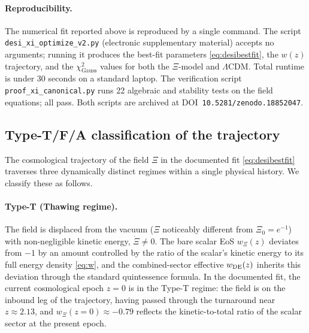 \documentclass[11pt,reqno]{amsart}
\theoremstyle{plain}
\theoremstyle{definition}
\theoremstyle{remark}
\begin{document}
\paragraph{Reproducibility.}
The numerical fit reported above is reproduced by a single command. The
script \texttt{desi\_xi\_optimize\_v2.py} (electronic supplementary material)
accepts no arguments; running it produces the best-fit parameters
\eqref{eq:desibestfit}, the $w(z)$ trajectory, and the
$\chi^{2}_{\text{Gauss}}$ values for both the $\Xi$-model and
$\Lambda$CDM. Total runtime is under 30 seconds on a standard laptop.
The verification script \texttt{proof\_xi\_canonical.py} runs 22
algebraic and stability tests on the field equations; all pass. Both
scripts are archived at DOI~\texttt{10.5281/zenodo.18852047}.

\subsection{Type-T/F/A classification of the trajectory}\label{sec:typeTFA}

The cosmological trajectory of the field $\Xi$ in the documented fit
\eqref{eq:desibestfit} traverses three dynamically distinct regimes
within a single physical history. We classify these as follows.

\paragraph{Type-T (Thawing regime).}
The field is displaced from the vacuum ($\Xi$ noticeably different from
$\Xi_0 = e^{-1}$) with non-negligible kinetic energy, $\dot\Xi \neq 0$.
The bare scalar EoS $w_\Xi(z)$ deviates from $-1$ by an amount controlled
by the ratio of the scalar's kinetic energy to its full energy density
\eqref{eq:w}, and the combined-sector effective $w_{\rm DE}(z)$ inherits
this deviation through the standard quintessence formula. In the
documented fit, the current cosmological epoch $z = 0$ is in the Type-T
regime: the field is on the inbound leg of the trajectory, having
passed through the turnaround near $z \approx 2.13$, and
$w_\Xi(z = 0) \approx -0.79$ reflects the kinetic-to-total ratio of
the scalar sector at the present epoch.
\end{document}
